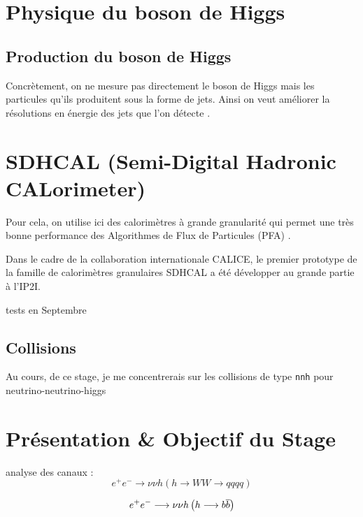 \section{Physique du boson de Higgs}

\subsection{Production du boson de Higgs}

Concrètement, on ne mesure pas directement le boson de Higgs mais les particules 
qu'ils produitent sous la forme de jets.
Ainsi on veut améliorer la résolutions en énergie des jets que l'on détecte \cite{liu:tel-03405418}.


\section{SDHCAL (Semi-Digital Hadronic CALorimeter)}

Pour cela, on utilise ici des calorimètres à grande granularité qui permet une 
très bonne performance des Algorithmes de Flux de Particules (PFA) \cite{liu:tel-03405418}.

Dans le cadre de la collaboration internationale CALICE, le premier prototype de la famille de calorimètres granulaires SDHCAL a été développer au grande partie à l'IP2I.

tests en Septembre

\subsection{Collisions}
Au cours, de ce stage, je me concentrerais sur les collisions de type \texttt{nnh} pour neutrino-neutrino-higgs



\section{Présentation \& Objectif du Stage}

analyse des canaux :
\begin{equation}
	e^{+} e^{-} \longrightarrow \nu \nu h \left(h \longrightarrow WW \longrightarrow qqqq \right)
\end{equation}

\begin{equation}
	e^{+} e^{-} \longrightarrow \nu \nu h \left(h \longrightarrow b \overline{b} \right)
\end{equation}
